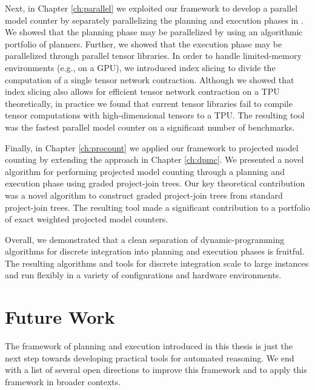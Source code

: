 Next, in Chapter \ref{ch:parallel} we exploited our framework to develop a parallel model counter by separately parallelizing the planning and execution phases in .
We showed that the planning phase may be parallelized by using an algorithmic portfolio \cite{XHHL08} of planners.
Further, we showed that the execution phase may be parallelized through parallel tensor libraries.
In order to handle limited-memory environments (e.g., on a GPU), we introduced index slicing to divide the computation of a single tensor network contraction.
Although we showed that index slicing also allows for efficient tensor network contraction on a TPU theoretically, in practice we found that current tensor libraries fail to compile tensor computations with high-dimensional tensors to a TPU.
The resulting tool  was the fastest parallel model counter on a significant number of benchmarks.

Finally, in Chapter \ref{ch:procount} we applied our framework to projected model counting by extending the approach in Chapter \ref{ch:dpmc}.
We presented a novel algorithm for performing projected model counting through a planning and execution phase using graded project-join trees.
Our key theoretical contribution was a novel algorithm to construct graded project-join trees from standard project-join trees.
The resulting tool  made a significant contribution to a portfolio of exact weighted projected model counters.

Overall, we demonstrated that a clean separation of dynamic-programming algorithms for discrete integration into planning and execution phases is fruitful. The resulting algorithms and tools for discrete integration scale to large instances and run flexibly in a variety of configurations and hardware environments.

\section{Future Work}
The framework of planning and execution introduced in this thesis is just the next step towards developing practical tools for automated reasoning.
We end with a list of several open directions to improve this framework and to apply this framework in broader contexts.


